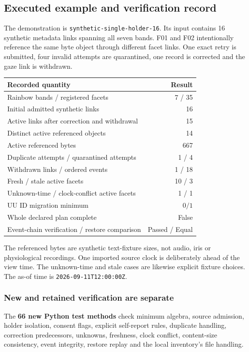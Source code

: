 \documentclass[11pt,a4paper]{article}
\newcommand{\newpagehead}[1]{\clearpage\subsection{#1}}
\begin{document}
\newpagehead{Executed example and verification record}
The demonstration is \texttt{synthetic-single-holder-16}. Its input contains 16 synthetic metadata links spanning all seven bands. F01 and F02 intentionally reference the same byte object through different facet links. One exact retry is submitted, four invalid attempts are quarantined, one record is corrected and the gaze link is withdrawn.

\begin{center}\begin{tabularx}{\textwidth}{@{}Xr@{}}\toprule
\textbf{Recorded quantity} & \textbf{Result}\\\midrule
Rainbow bands / registered facets & 7 / 35\\
Initial admitted synthetic links & 16\\
Active links after correction and withdrawal & 15\\
Distinct active referenced objects & 14\\
Active referenced bytes & 667\\
Duplicate attempts / quarantined attempts & 1 / 4\\
Withdrawn links / ordered events & 1 / 18\\
Fresh / stale active facets & 10 / 3\\
Unknown-time / clock-conflict active facets & 1 / 1\\
UU ID migration minimum & $0/1$\\
Whole declared plan complete & False\\
Event-chain verification / restore comparison & Passed / Equal\\\bottomrule
\end{tabularx}\end{center}

The referenced bytes are synthetic text-fixture sizes, not audio, iris or physiological recordings. One imported source clock is deliberately ahead of the view time. The unknown-time and stale cases are likewise explicit fixture choices. The as-of time is \texttt{2026-09-11T12:00:00Z}.

\subsubsection{New and retained verification are separate}
The \textbf{66 new Python test methods} check minimum algebra, source admission, holder isolation, consent flags, explicit self-report rules, duplicate handling, correction predecessors, unknowns, freshness, clock conflict, content-size consistency, event integrity, restore replay and the local inventory's file handling.
\end{document}
